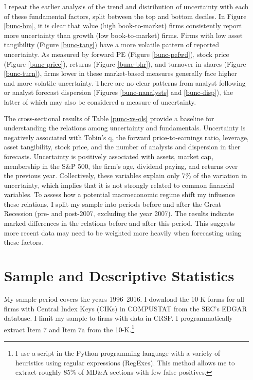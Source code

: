 \documentclass[12pt, letterpaper]{article}
\begin{document}
I repeat the earlier analysis of the trend and distribution of uncertainty with each of these fundamental factors, split between the top and bottom deciles.  In Figure \ref{bunc-bm}, it is clear that value (high book-to-market) firms consistently report more uncertainty than growth (low book-to-market) firms. Firms with low asset tangibility (Figure \ref{bunc-tang}) have a more volatile pattern of reported uncertainty. As measured by forward PE (Figure \ref{bunc-pefwd}), stock price (Figure \ref{bunc-price}), returns (Figure \ref{bunc-bhr}), and turnover in shares (Figure \ref{bunc-turn}), firms lower in these market-based measures generally face higher and more volatile uncertainty. There are no clear patterns from analyst following or analyst forecast dispersion (Figures \ref{bunc-nanalysts} and \ref{bunc-disp}), the latter of which may also be considered a measure of uncertainty.

The cross-sectional results of Table \ref{punc-xs-ols} provide a baseline for understanding the relations among uncertainty and fundamentals.
Uncertainty is negatively associated with Tobin's q, the forward price-to-earnings ratio, leverage, asset tangibility, stock price, and the number of analysts and dispersion in ther forecasts.
Uncertainty is positively associated with assets, market cap, membership in the S\&P 500, the firm's age, dividend paying, and returns over the previous year.
Collectively, these variables explain only 7\% of the variation in uncertainty, which implies that it is not strongly related to common financial variables.
To assess how a potential macroeconomic regime shift my influence these relations, I split my sample into periods before and after the Great Recession (pre- and post-2007, excluding the year 2007). The results indicate marked differences in the relations before and after this period. This suggests more recent data may need to be weighted more heavily when forecasting using these factors.

\section{Sample and Descriptive Statistics} \label{data} 
My sample period covers the years 1996--2016. I download the 10-K forms for all firms with Central Index Keys (CIKs) in COMPUSTAT from the SEC's EDGAR database. I limit my sample to firms with data in CRSP. I programmatically extract Item 7 and Item 7a from the 10-K.\footnote{I use a script in the Python programming language with a variety of heuristics using regular expressions (RegExes). This method allows me to extract roughly 85\% of MD\&A sections with few false positives.}
\end{document}
